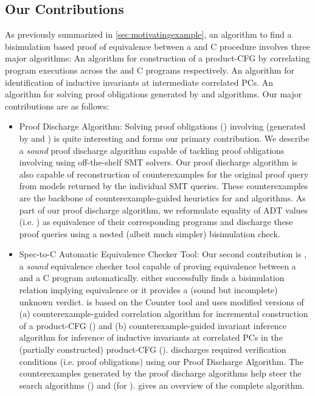 \subsection{Our Contributions}
\label{sec:contribs}
As previously summarized in \cref{sec:motivatingexample}, an algorithm to find a bisimulation based proof of equivalence
between a \SpecL{} and C procedure involves three major algorithms:
 An algorithm for construction of a product-CFG by correlating program executions
across the \SpecL{} and C programs respectively.
 An algorithm for identification of inductive invariants at intermediate correlated PCs.
 An algorithm for solving proof obligations generated by  and  algorithms.
Our major contributions are as follows:

\begin{itemize}
\item Proof Discharge Algorithm: Solving proof obligations () involving \recursiveRelations{}
(generated by  and ) is quite interesting and forms our primary contribution.
We describe a {\em sound} proof discharge algorithm capable of tackling proof obligations involving
\recursiveRelations{} using off-the-shelf SMT solvers. Our proof discharge algorithm is also capable of
reconstruction of counterexamples for the original proof query from models returned by the individual SMT queries.
These counterexamples are the backbone of counterexample-guided heuristics for  and  algorithms.
As part of our proof discharge algorithm,
we reformulate equality of ADT values (i.e. \recursiveRelations{}) as equivalence of their corresponding programs
and discharge these proof queries using a nested (albeit much simpler) bisimulation check.

\item Spec-to-C Automatic Equivalence Checker Tool: Our second contribution is \toolName{}, a {\em sound} equivalence checker tool
capable of proving equivalence between a \SpecL{} and a C program automatically.
\toolName{} either successfully finds a bisimulation relation implying equivalence or it provides a (sound but incomplete) unknown verdict.
\toolName{} is based on the Counter tool\cite{oopsla20} and uses modified versions of (a) counterexample-guided correlation algorithm for
incremental construction of a product-CFG () and (b) counterexample-guided invariant inference algorithm
for inference of inductive invariants at correlated PCs in the (partially constructed) product-CFG ().
\toolName{} discharges required verification conditions (i.e. proof obligations) using our Proof Discharge Algorithm.
The counterexamples generated by the proof discharge algorithms help steer the search algorithms () and (for ).
 gives an overview of the complete algorithm.
\end{itemize}

